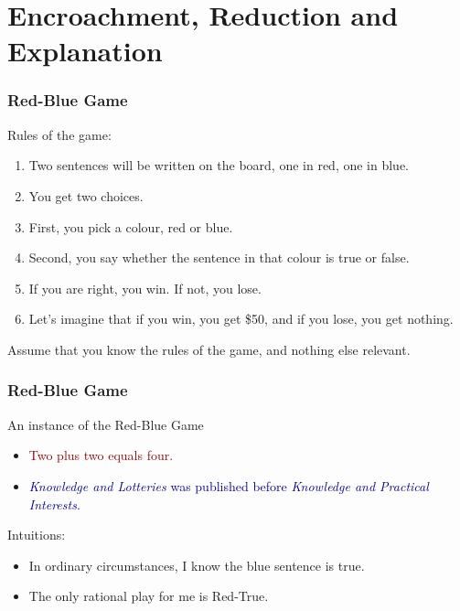 
\def\latexmode{beamer}
\def\mytitle{Interests and Evidence}
\def\myauthor{Brian Weatherson}
\def\mydate{June, 2017}


\section{Encroachment, Reduction and Explanation}
\label{encroachmentreductionandexplanation}

\begin{frame}

\frametitle{Red-Blue Game}
\label{red-bluegame}

Rules of the game:

\begin{enumerate}
\item Two sentences will be written on the board, one in red, one in blue.

\item You get two choices.

\item First, you pick a colour, red or blue.

\item Second, you say whether the sentence in that colour is true or false.

\item If you are right, you win. If not, you lose.

\item Let's imagine that if you win, you get \$50, and if you lose, you get nothing.

\end{enumerate}
Assume that you know the rules of the game, and nothing else relevant.

\end{frame}

\begin{frame}

\frametitle{Red-Blue Game}
\label{red-bluegame}

An instance of the Red-Blue Game 

\begin{itemize}
\item \textcolor{darkred}{Two plus two equals four.}

\item \textcolor{darkblue}{\textit{Knowledge and Lotteries} was published before \textit{Knowledge and Practical Interests}.}

\end{itemize}
Intuitions:

\begin{itemize}
\item In ordinary circumstances, I know the blue sentence is true.

\item The only rational play for me is Red-True.

\end{itemize}
\end{frame}

